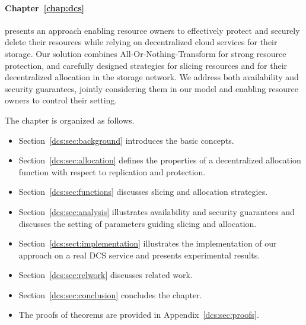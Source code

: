 \medskip

\paragraph*{Chapter~\ref{chap:dcs}}
presents an approach enabling resource owners to effectively protect and securely delete their resources while relying on decentralized cloud services for their storage.
Our solution combines All-Or-Nothing-Transform for strong resource protection, and carefully designed strategies for slicing resources and for their decentralized allocation in the storage network.  We address both availability and security guarantees, jointly considering them in our model and enabling resource owners to control their setting.

\smallskip

The chapter is organized as follows.

\begin{itemize}
\item Section~\ref{dcs:sec:background} introduces the basic concepts.
\item Section~\ref{dcs:sec:allocation} defines the properties of a decentralized allocation function with respect to replication and protection.
\item Section~\ref{dcs:sec:functions} discusses slicing and allocation strategies.
\item Section~\ref{dcs:sec:analysis} illustrates availability and security guarantees and discusses the setting of parameters guiding slicing and allocation.
\item Section~\ref{dcs:sect:implementation} illustrates the implementation of our approach on a real DCS service and presents experimental results.
\item Section~\ref{dcs:sec:relwork} discusses related work.
\item Section~\ref{dcs:sec:conclusion} concludes the chapter. 
\item The proofs of theorems are provided in Appendix~\ref{dcs:sec:proofs}.
\end{itemize}

\medskip


